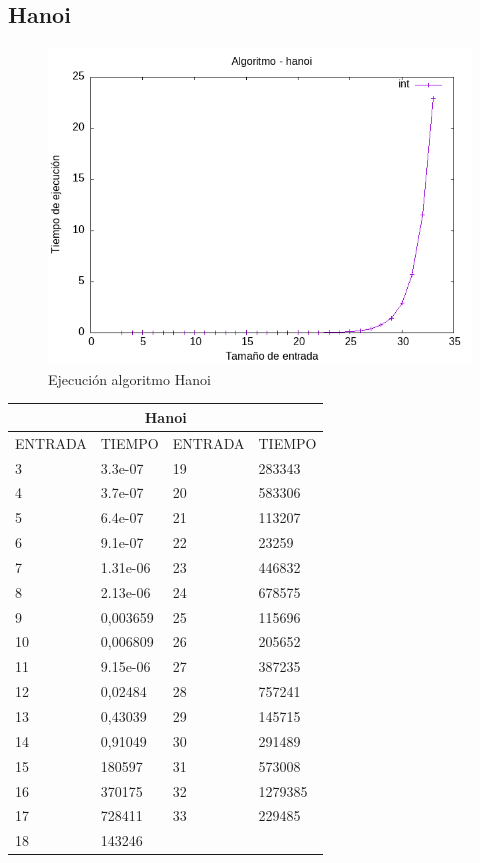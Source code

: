 \documentclass[11pt]{article}
\begin{document}
\subsection*{Hanoi}
\begin{figure}[H]
    
        \centering
        \includegraphics[width=0.5\linewidth]{assets/Img/hanoiint.png}
        \caption{Ejecución algoritmo Hanoi}
        \label{fig:hanoi}       
\end{figure}
\begin{table}[!ht]
    \centering
    \begin{tabular}{|l|l|l|l|}
    \hline
        \multicolumn{4}{|c|}{\cellcolor{blue!20}\textbf{Hanoi}} \\ \hline 
        ENTRADA & TIEMPO & ENTRADA & TIEMPO \\ \hline
        3 & 3.3e-07 & 19 & 283343 \\ \hline
        4 & 3.7e-07 & 20 & 583306 \\ \hline
        5 & 6.4e-07 & 21 & 113207 \\ \hline
        6 & 9.1e-07 & 22 & 23259 \\ \hline
        7 & 1.31e-06 & 23 & 446832 \\ \hline
        8 & 2.13e-06 & 24 & 678575 \\ \hline
        9 & 0,003659 & 25 & 115696 \\ \hline
        10 & 0,006809 & 26 & 205652 \\ \hline
        11 & 9.15e-06 & 27 & 387235 \\ \hline
        12 & 0,02484 & 28 & 757241 \\ \hline
        13 & 0,43039 & 29 & 145715 \\ \hline
        14 & 0,91049 & 30 & 291489 \\ \hline
        15 & 180597 & 31 & 573008 \\ \hline
        16 & 370175 & 32 & 1279385 \\ \hline
        17 & 728411 & 33 & 229485 \\ \hline
        18 & 143246 \\ \hline
    \end{tabular}
\end{table}
\end{document}
